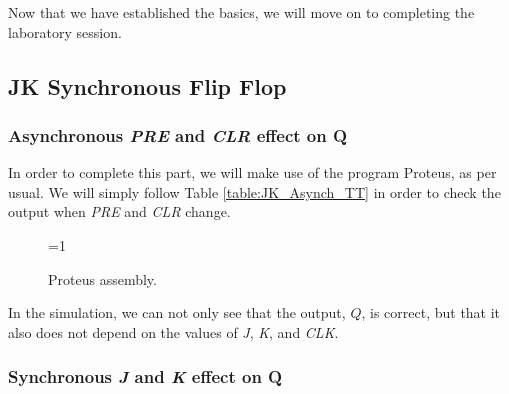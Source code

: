 \newpage

Now that we have established the basics, we will move on to completing the laboratory session.

\subsection{JK Synchronous Flip Flop}

\subsubsection{Asynchronous \textit{PRE} and \textit{CLR} effect on Q}

In order to complete this part, we will make use of the program Proteus, as per usual. We will simply follow Table \ref{table:JK_Asynch_TT} in order to check the output when \textit{PRE} and \textit{CLR} change.

\begin{figure}[H]
    \centering
    
    \ifnum\value{ANIMATION}=1 {
    } 
    \fi
    
    \caption{Proteus assembly.}
    \label{fig:PROTEUS_JK_ASYNCH}
\end{figure}

In the simulation, we can not only see that the output, $Q$, is correct, but that it also does not depend on the values of \textit{J}, \textit{K}, and \textit{CLK}. 

\subsubsection{Synchronous \textit{J} and \textit{K} effect on Q}

